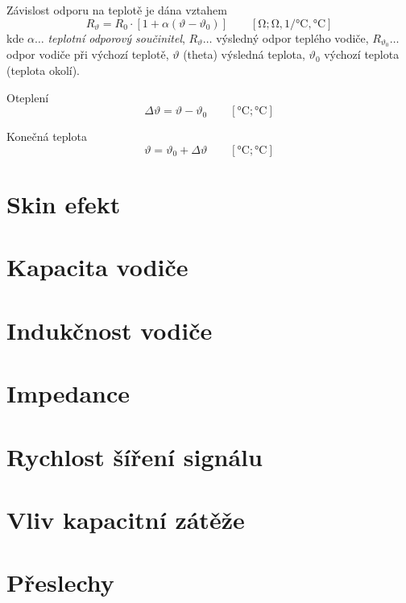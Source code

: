 
  Závislost odporu na teplotě je dána vztahem \cite[s.~24]{Necasek1972} 
  \begin{equation}\label{ape:eq002}
    R_\vartheta = R_0\cdot[1+\alpha(\vartheta - \vartheta_0)] \qquad[\si{\ohm};\si{\ohm}, 
    \si{1\per\degreeCelsius}, \si{\degreeCelsius}]
  \end{equation}
  kde \(\alpha\ldots\) \emph{teplotní odporový součinitel}, \(R_\vartheta\ldots\) výsledný odpor 
  teplého vodiče,  \(R_{\vartheta_0}\ldots\) odpor vodiče při výchozí teplotě, \(\vartheta\) 
  (theta) výsledná teplota, \(\vartheta_0\) výchozí teplota (teplota okolí).
  
  Oteplení 
  \begin{equation}\label{ape:eq003}
    \Delta\vartheta = \vartheta - \vartheta_0 \qquad[\si{\degreeCelsius}; \si{\degreeCelsius}]
  \end{equation}
  
  Konečná teplota
  \begin{equation}\label{ape:eq004}
    \vartheta = \vartheta_0 + \Delta\vartheta \qquad[\si{\degreeCelsius}; \si{\degreeCelsius}]
  \end{equation}

\section{Skin efekt}
\section{Kapacita vodiče}
\section{Indukčnost vodiče}
\section{Impedance}
\section{Rychlost šíření signálu}
\section{Vliv kapacitní zátěže}
\section{Přeslechy}

